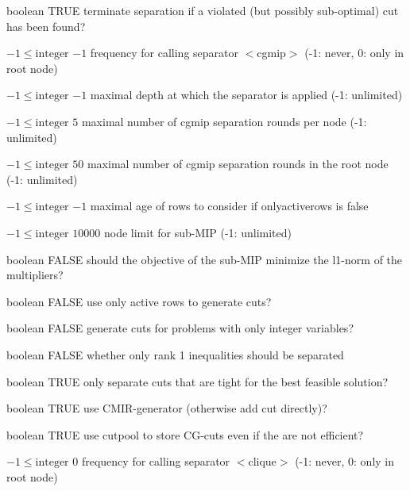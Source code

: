 %
{boolean}%
{TRUE}%
{terminate separation if a violated (but possibly sub-optimal) cut has been found?}%
{}

%
{$-1\leq\textrm{integer}$}%
{$-1$}%
{frequency for calling separator $<$cgmip$>$ (-1: never, 0: only in root node)}%
{}

%
{$-1\leq\textrm{integer}$}%
{$-1$}%
{maximal depth at which the separator is applied (-1: unlimited)}%
{}

%
{$-1\leq\textrm{integer}$}%
{$5$}%
{maximal number of cgmip separation rounds per node (-1: unlimited)}%
{}

%
{$-1\leq\textrm{integer}$}%
{$50$}%
{maximal number of cgmip separation rounds in the root node (-1: unlimited)}%
{}

%
{$-1\leq\textrm{integer}$}%
{$-1$}%
{maximal age of rows to consider if onlyactiverows is false}%
{}

%
{$-1\leq\textrm{integer}$}%
{$10000$}%
{node limit for sub-MIP (-1: unlimited)}%
{}

%
{boolean}%
{FALSE}%
{should the objective of the sub-MIP minimize the l1-norm of the multipliers?}%
{}

%
{boolean}%
{FALSE}%
{use only active rows to generate cuts?}%
{}

%
{boolean}%
{FALSE}%
{generate cuts for problems with only integer variables?}%
{}

%
{boolean}%
{FALSE}%
{whether only rank 1 inequalities should be separated}%
{}

%
{boolean}%
{TRUE}%
{only separate cuts that are tight for the best feasible solution?}%
{}

%
{boolean}%
{TRUE}%
{use CMIR-generator (otherwise add cut directly)?}%
{}

%
{boolean}%
{TRUE}%
{use cutpool to store CG-cuts even if the are not efficient?}%
{}

%
{$-1\leq\textrm{integer}$}%
{$0$}%
{frequency for calling separator $<$clique$>$ (-1: never, 0: only in root node)}%
{}


